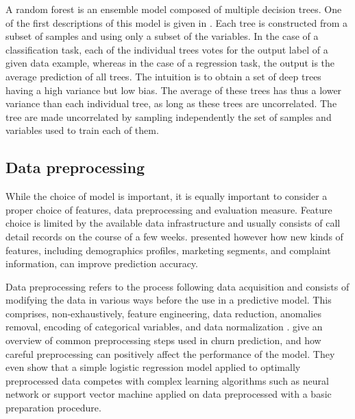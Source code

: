 A random forest is an ensemble model composed of multiple decision trees. One of
the first descriptions of this model is given in \textcite{breiman2001random}.
Each tree is constructed from a subset of samples and using only a subset of the
variables. In the case of a classification task, each of the individual trees
votes for the output label of a given data example, whereas in the case of a
regression task, the output is the average prediction of all trees. The
intuition is to obtain a set of deep trees having a high variance but low bias.
The average of these trees has thus a lower variance than each individual tree,
as long as these trees are uncorrelated. The tree are made uncorrelated by
sampling independently the set of samples and variables used to train each of
them.

\subsection{Data preprocessing}

While the choice of model is important, it is equally important to consider a
proper choice of features, data preprocessing and evaluation measure. Feature
choice is limited by the available data infrastructure and usually consists of
call detail records on the course of a few weeks. \textcite{huang2012customer}
presented however how new kinds of features, including demographics profiles,
marketing segments, and complaint information, can improve prediction accuracy.

Data preprocessing refers to the process following data acquisition and
consists of modifying the data in various ways before the use in a predictive
model. This comprises, non-exhaustively, feature engineering, data reduction,
anomalies removal, encoding of categorical variables, and data normalization
\parencite{zhang2003data}. \textcite{coussement2017comparative} give an overview
of common preprocessing steps used in churn prediction, and how careful
preprocessing can positively affect the performance of the model. They even show
that a simple logistic regression model applied to optimally preprocessed data
competes with complex learning algorithms such as neural network or support
vector machine applied on data preprocessed with a basic preparation procedure.

